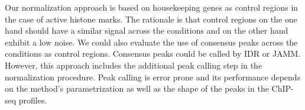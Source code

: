 Our normalization approach is based on housekeeping genes as control regions in the case of active histone marks.
The rationale is that control regions on the one hand should have a similar signal across the conditions and on the other hand exhibit a low noise.
We could also evaluate the use of consensus peaks across the conditions as control regions.
Consensus peaks could be called by IDR or JAMM.
However, this approach includes the additional peak calling step in the normalization procedure.
Peak calling is error prone and its performance depends on the method's parametrization as well as the shape of the peaks in the ChIP-seq profiles.


